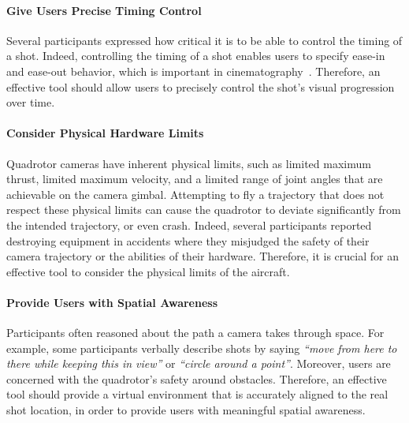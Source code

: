 \paragraph{Give Users Precise Timing Control}
Several participants expressed how critical it is to be able to control the timing of a shot.
Indeed, controlling the timing of a shot enables users to specify ease-in and ease-out behavior, which is important in cinematography~\cite{arijon:1976,lasseter:1987}.
Therefore, an effective tool should allow users to precisely control the shot's visual progression over time.

\paragraph{Consider Physical Hardware Limits} 
Quadrotor cameras have inherent physical limits, such as limited maximum thrust, limited maximum velocity, and a limited range of joint angles that are achievable on the camera gimbal.
Attempting to fly a trajectory that does not respect these physical limits can cause the quadrotor to deviate significantly from the intended trajectory, or even crash.
Indeed, several participants reported destroying equipment in accidents where they misjudged the safety of their camera trajectory or the abilities of their hardware.
Therefore, it is crucial for an effective tool to consider the physical limits of the aircraft.

\paragraph{Provide Users with Spatial Awareness}
Participants often reasoned about the path a camera takes through space.
For example, some participants verbally describe shots by saying \emph{``move from here to there while keeping this in view''} or \emph{``circle around a point''}.
Moreover, users are concerned with the quadrotor's safety around obstacles.
Therefore, an effective tool should provide a virtual environment that is accurately aligned to the real shot location, in order to provide users with meaningful spatial awareness.

